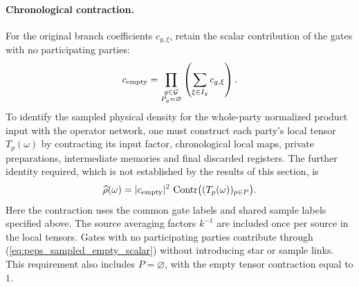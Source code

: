 \paragraph{Chronological contraction.}
For the original branch coefficients $c_{g,\xi}$, retain the scalar
contribution of the gates with no participating parties:
\begin{align}
    c_{\rm empty}
    =\prod_{\substack{g\in\mathcal G\\P_g=\varnothing}}
      \left(\sum_{\xi\in I_g}c_{g,\xi}\right).
    \label{eq:peps_sampled_empty_scalar}
\end{align}
To identify the sampled physical density for the whole-party normalized
product input with the operator network, one must construct each party's
local tensor $T_p(\omega)$ by contracting its input factor, chronological
local maps, private preparations, intermediate memories and final discarded
registers. The further identity required, which is not established by the
results of this section, is
\begin{align}
    \widehat\rho(\omega)
    =|c_{\rm empty}|^2\,
      \operatorname{Contr}\bigl((T_p(\omega))_{p\in P}\bigr).
    \label{eq:peps_sampled_chronology_required}
\end{align}
Here the contraction uses the common gate labels and shared sample labels
specified above. The source averaging factors $k^{-1}$ are included once
per source in the local tensors. Gates with no participating parties
contribute through (\ref{eq:peps_sampled_empty_scalar}) without introducing
star or sample links. This requirement also includes $P=\varnothing$,
with the empty tensor contraction equal to $1$.
